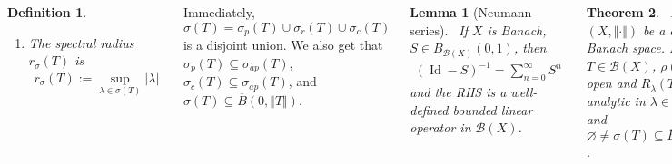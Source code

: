 \documentclass{tikzposter} %
\DeclareMathOperator{\Id}{Id}
\newtheorem{theorem}{Theorem}
\newtheorem{lemma}[theorem]{Lemma}
\newtheorem{definition}{Definition}
\begin{document}
\begin{columns}
{\begin{definition}
\begin{enumerate}[label=\roman*.]
            \begin{align*}
              \sigma_{ap}(T) := \{\lambda \in \mathbb{C} : \exists (x_{n}) \in \partial B_{X}(0,1)\, \mathrm{s.t.}\, \Vert Tx_{n} - \lambda x_{n} \Vert \to 0 \}.
            \end{align*}
            \item The spectral radius $r_{\sigma}(T)$ is
            \begin{align*}
              r_{\sigma}(T) := \sup_{\lambda \in \sigma(T)} |\lambda|
            \end{align*}
    \end{enumerate}
    \end{definition}
    \hphantom{}

    Immediately, $\sigma(T) = \sigma_{p}(T) \cup \sigma_{r}(T) \cup \sigma_{c}(T)$ is a disjoint union. We also get that $\sigma_{p}(T) \subseteq \sigma_{ap}(T)$, $\sigma_{c}(T) \subseteq \sigma_{ap}(T)$, and $\sigma(T) \subseteq \overline{B}(0,\Vert T \Vert)$. \\

    \begin{lemma}[Neumann series]
    \ If $X$ is Banach, $S \in B_{\mathcal{B}(X)}(0,1)$, then
    \begin{align*}
      (\Id - S)^{-1} = \sum_{n=0}^{\infty} S^{n}
    \end{align*}
    and the RHS is a well-defined bounded linear operator in $\mathcal{B}(X)$.
    \end{lemma}
    \hphantom{}

    \begin{theorem}
    \ Let $(X, \Vert \cdot \Vert)$ be a complex Banach space. For $T \in \mathcal{B}(X)$, $\rho(T)$ is open and $R_{\lambda}(T)$ is analytic in $\lambda \in \rho(T)$, and $\varnothing \neq \sigma(T) \subseteq \overline{B}(0, \Vert T \Vert)$.
    \end{theorem}
    \hphantom{}

    \begin{lemma}
    \ Let $(X, \Vert \cdot \Vert)$ be a normed space, $S, T \in \mathcal{B}(X)$. If $ST = TS$ and $ST$ is invertible, then $S$ and $T$ are invertible.
    \end{lemma}
    \hphantom{}

    \begin{theorem}
    \ Let $(X, \Vert \cdot \Vert)$ be a complex Banach space, $T \in \mathcal{B}(X)$, $p : \mathbb{C} \to \mathbb{C}$ a complex polynomial. Then $\sigma(p(T)) = p(\sigma(T))$.
    \end{theorem}
    \hphantom{}

}
\end{columns}
\end{document}
